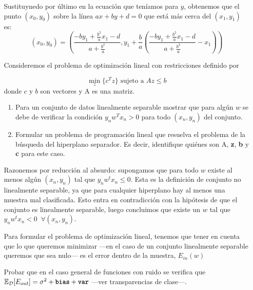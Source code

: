 \documentclass[a4paper, 11pt]{article}
\begin{document}
\begin{solucion}
          Sustituynedo por último en la ecuación que teníamos para $y$, obtenemos que el punto $(x_0,y_0)$ sobre la línea $ax+by+d=0$ que está más cerca del $(x_1,y_1)$ es:
          \[
          (x_0,y_0) = (\frac{-by_1 + \frac{b^2}{a}x_1 - d}{a + \frac{b^2}{a}}, y_1 + \frac{b}{a} (\frac{-by_1 + \frac{b^2}{a}x_1 - d}{a + \frac{b^2}{a}}-x_1))
          \]

      \end{solucion}

      \begin{ejercicio}
        \item Consideremos el problema de optimización lineal con restricciones definido por

        \[
        \min_z \{c^Tz\} \textrm{ sujeto a } Az \leq b
        \]
        donde $c$ y $b$ son vectores y A es una matriz.

             \begin{enumerate}
                \item Para un conjunto de datos linealmente separable mostrar que para algún $w$ se debe de verificar la condición  $y_n w^T x_n > 0$ para todo $(x_n,y_n)$ del conjunto.
                \item Formular un problema de programación lineal que resuelva el problema de la búsqueda del hiperplano separador. Es decir, identifique quiénes son A, \textbf{z}, \textbf{b} y \textbf{c} para este caso.
            \end{enumerate}
      \end{ejercicio}

      \begin{solucion}
        Razonemos por reducción al absurdo: supongamos que para todo $w$ existe al menos algún $(x_n, y_n)$ tal que $y_nw^tx_n \leq 0$. Esta es la definición de conjunto no linealmente separable, ya que para cualquier hiperplano hay al menos una muestra mal clasificada. Esto entra en contradicción con la hipótesis de que el conjunto es linealmente separable, luego concluimos que existe un $w$ tal que $y_n w^t x_n < 0 \;\; \forall (x_n,y_n)$.

        Para formular el problema de optimización lineal, tenemos que tener en cuenta que lo que queremos minimizar ---en el caso de un conjunto linealmente separable queremos que sea nulo--- es el error dentro de la muestra, $E_{in}(w)$
      \end{solucion}

      \begin{ejercicio}
        Probar que en el caso general de funciones con ruido se verifica que $\mathbb{E}_{\mathcal{D}}[E_{out}]= \sigma^2+\texttt{\textbf{bias}}+\texttt{\textbf{var}}$ ---ver transparencias de clase---.
      \end{ejercicio}
\end{document}
